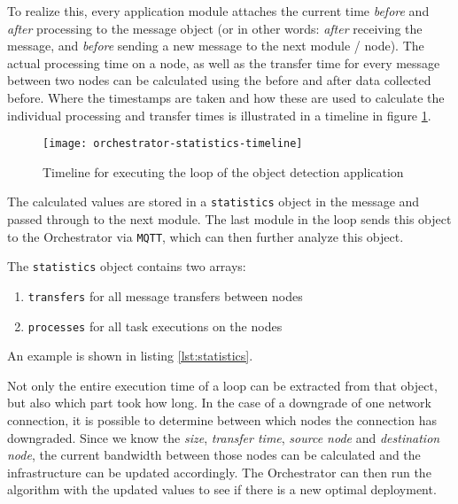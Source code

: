 To realize this, every application module attaches the current time \textit{before} and \textit{after} processing to the message object (or in other words: \textit{after} receiving the message, and \textit{before} sending a new message to the next module / node).
The actual processing time on a node, as well as the transfer time for every message between two nodes can be calculated using the before and after data collected before.
Where the timestamps are taken and how these are used to calculate the individual processing and transfer times is illustrated in a timeline in figure \ref{fig:orchestrator-statistics-timeline}.

\begin{figure}[h]
    \centering
    \texttt{[image: orchestrator-statistics-timeline]}
    \caption{Timeline for executing the loop of the object detection application}
    \label{fig:orchestrator-statistics-timeline}
\end{figure}

The calculated values are stored in a \texttt{statistics} object in the message and passed through to the next module. The last module in the loop sends this object to the Orchestrator via \texttt{MQTT}, which can then further analyze this object.

The \texttt{statistics} object contains two arrays:
\begin{enumerate}
    \item \texttt{transfers} for all message transfers between nodes
    \item \texttt{processes} for all task executions on the nodes
\end{enumerate}

An example is shown in listing \ref{lst:statistics}.



Not only the entire execution time of a loop can be extracted from that object, but also which part took how long. In the case of a downgrade of one network connection, it is possible to determine between which nodes the connection has downgraded. Since we know the \textit{size}, \textit{transfer time}, \textit{source node} and \textit{destination node}, the current bandwidth between those nodes can be calculated and the infrastructure can be updated accordingly. The Orchestrator can then run the algorithm with the updated values to see if there is a new optimal deployment.